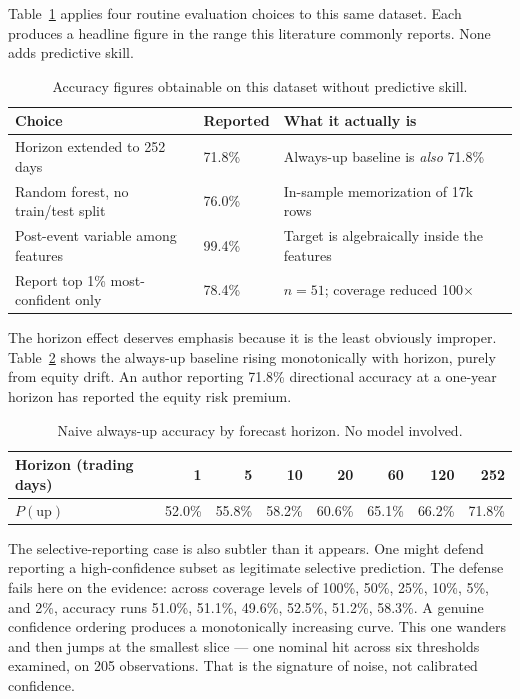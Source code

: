 \documentclass[11pt]{article}
\begin{document}
Table~\ref{tab:inflate} applies four routine evaluation choices to this same dataset. Each produces a headline figure in the range this literature commonly reports. None adds predictive skill.

\begin{table}[H]
\centering
\caption{Accuracy figures obtainable on this dataset without predictive skill.}
\label{tab:inflate}
\begin{tabular}{llll}
\toprule
\textbf{Choice} & \textbf{Reported} & \textbf{What it actually is} \\
\midrule
Horizon extended to 252 days & 71.8\% & Always-up baseline is \textit{also} 71.8\% \\
Random forest, no train/test split & 76.0\% & In-sample memorization of 17k rows \\
Post-event variable among features & 99.4\% & Target is algebraically inside the features \\
Report top 1\% most-confident only & 78.4\% & $n = 51$; coverage reduced 100$\times$ \\
\bottomrule
\end{tabular}
\end{table}

The horizon effect deserves emphasis because it is the least obviously improper. Table~\ref{tab:baserate} shows the always-up baseline rising monotonically with horizon, purely from equity drift. An author reporting 71.8\% directional accuracy at a one-year horizon has reported the equity risk premium.

\begin{table}[H]
\centering
\caption{Naive always-up accuracy by forecast horizon. No model involved.}
\label{tab:baserate}
\begin{tabular}{lrrrrrrr}
\toprule
\textbf{Horizon (trading days)} & 1 & 5 & 10 & 20 & 60 & 120 & 252 \\
\midrule
\textbf{$P(\text{up})$} & 52.0\% & 55.8\% & 58.2\% & 60.6\% & 65.1\% & 66.2\% & 71.8\% \\
\bottomrule
\end{tabular}
\end{table}

The selective-reporting case is also subtler than it appears. One might defend reporting a high-confidence subset as legitimate selective prediction. The defense fails here on the evidence: across coverage levels of 100\%, 50\%, 25\%, 10\%, 5\%, and 2\%, accuracy runs 51.0\%, 51.1\%, 49.6\%, 52.5\%, 51.2\%, 58.3\%. A genuine confidence ordering produces a monotonically increasing curve. This one wanders and then jumps at the smallest slice --- one nominal hit across six thresholds examined, on 205 observations. That is the signature of noise, not calibrated confidence.
\end{document}
